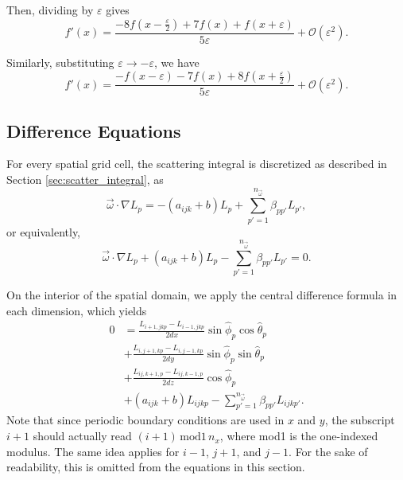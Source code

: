 Then, dividing by $\varepsilon$ gives
\begin{equation*}
  f'(x) = \frac{-8f(x-\frac{\varepsilon}{2}) + 7f(x) + f(x+\varepsilon)}{5\varepsilon} + \mathcal{O}(\varepsilon^2).
\end{equation*}

Similarly, substituting $\varepsilon \to -\varepsilon$, we have
\begin{equation*}
  f'(x) = \frac{- f(x-\varepsilon) - 7f(x) + 8f(x+\frac{\varepsilon}{2})}{5\varepsilon} + \mathcal{O}(\varepsilon^2).
\end{equation*}


\subsection{Difference Equations}
\label{sec:difference_equations}

For every spatial grid cell, the scattering integral is discretized as described in Section \ref{sec:scatter_integral}, as
\begin{equation*}
  \vec{\omega} \cdot \nabla L_p = -(a_{ijk}+b) L_p + \sum_{p'=1}^{n_{\vec{\omega}}} \beta_{pp'}L_{p'},
\end{equation*}
or equivalently,
\begin{equation*}
  \vec{\omega} \cdot \nabla L_p + (a_{ijk}+b)L_p - \sum_{p'=1}^{n_{\vec{\omega}}} \beta_{pp'} L_{p'} = 0.
\end{equation*}

On the interior of the spatial domain, we apply the central difference formula in each dimension, which yields
\begin{equation*}
  \begin{aligned}
    0 &= \frac{L_{i+1,jkp}-L_{i-1,jkp}}{2dx}\sin\hat{\phi}_p\cos\hat{\theta}_p \\
    &+ \frac{L_{i,j+1,kp}-L_{i,j-1,kp}}{2dy}\sin\hat{\phi}_p\sin\hat{\theta}_p \\
    &+ \frac{L_{ij,k+1,p}-L_{ij,k-1,p}}{2dz}\cos\hat{\phi}_p \\
    &+ (a_{ijk}+b)L_{ijkp}  - \sum_{p'=1}^{n_{\vec{\omega}}} \beta_{pp'} L_{ijkp'}.
  \end{aligned}
\end{equation*}
Note that since periodic boundary conditions are used in $x$ and $y$,
the subscript $i+1$ should actually read $(i+1) \, \mbox{mod1}\,  n_x$, where
mod1 is the one-indexed modulus.
The same idea applies for $i-1$, $j+1$, and $j-1$.
For the sake of readability, this is omitted from the equations in this section.


